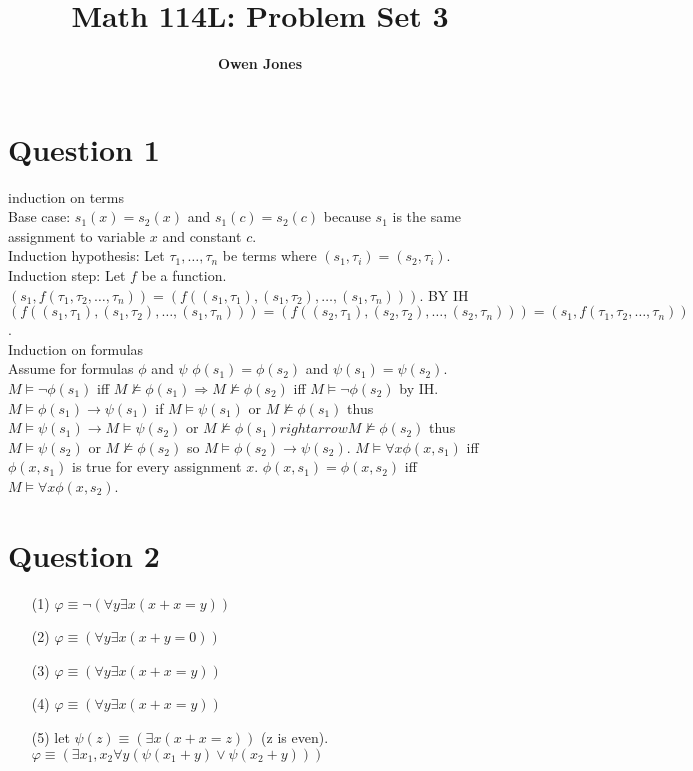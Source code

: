 \documentclass[10pt]{article}
\title{\bf Math 114L\@: Problem Set 3}
\author{\bf Owen Jones}
\begin{document}
\maketitle
\section*{Question 1}
induction on terms\\
Base case: $s_1(x)=s_2(x)$ and $s_1(c)=s_2(c)$ because $s_1$ is the same assignment to variable $x$ and constant $c$.\\
Induction hypothesis: Let $\tau_1,\ldots,\tau_n$ be terms where $(s_1,\tau_i)=(s_2,\tau_i)$.\\
Induction step: Let $f$ be a function. $(s_1,f(\tau_1,\tau_2,\ldots,\tau_n))=(f((s_1,\tau_1),(s_1,\tau_2),\ldots,(s_1,\tau_n)))$. 
BY IH $(f((s_1,\tau_1),(s_1,\tau_2),\ldots,(s_1,\tau_n)))=(f((s_2,\tau_1),(s_2,\tau_2),\ldots,(s_2,\tau_n)))=(s_1,f(\tau_1,\tau_2,\ldots,\tau_n))$.\\
Induction on formulas\\
Assume for formulas $\phi$ and $\psi$ $\phi(s_1)=\phi(s_2)$ and $\psi(s_1)=\psi(s_2)$.\\
$M\models \lnot\phi(s_1)$ iff $M\not\models\phi(s_1)\Rightarrow M\not\models\phi(s_2)$ iff $M\models \lnot\phi(s_2)$ by IH.\\
$M\models \phi(s_1)\rightarrow\psi(s_1)$ if $M\models\psi(s_1)$ or $M\not\models\phi(s_1)$ thus $M\models\psi(s_1)\rightarrow M\models\psi(s_2)$ or $M\not\models\phi(s_1)rightarrow M\not\models\phi(s_2)$ thus $M\models\psi(s_2)$ or $M\not\models\phi(s_2)$ so $M\models \phi(s_2)\rightarrow\psi(s_2)$.
$M\models\forall x\phi(x,s_1)$ iff $\phi(x,s_1)$ is true for every assignment $x$. $\phi(x,s_1)=\phi(x,s_2)$ iff $M\models\forall x\phi(x,s_2)$.
\section*{Question 2}
\begin{itemize}
    \item [(1)] $\varphi\equiv\lnot(\forall y\exists x(x+x=y))$
    \item [(2)] $\varphi\equiv(\forall y\exists x(x+y=0))$
    \item [(3)] $\varphi\equiv(\forall y\exists x(x+x=y))$
    \item [(4)] $\varphi\equiv(\forall y\exists x(x+x=y))$
    \item [(5)] let $\psi(z)\equiv (\exists x(x+x=z))$ (z is even).\\ 
    $\varphi\equiv(\exists x_1,x_2\forall y(\psi(x_1+y)\lor\psi(x_2+y)))$
\end{itemize}
\end{document}
